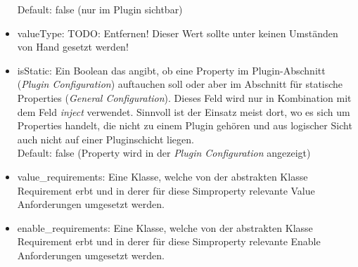 \documentclass[a4paper, 11pt]{article} %
\begin{document}
\begin{itemize}
	Default: false (nur im Plugin sichtbar)
	\item valueType: TODO: Entfernen! Dieser Wert sollte unter keinen Umständen von Hand gesetzt werden! 
	\item isStatic: Ein Boolean das angibt, ob eine Property im Plugin-Abschnitt (\emph{Plugin Configuration}) auftauchen soll oder aber im Abschnitt für statische Properties (\emph{General Configuration}). Dieses Feld wird nur in Kombination mit dem Feld \emph{inject} verwendet. Sinnvoll ist der Einsatz meist dort, wo es sich um Properties handelt, die nicht zu einem Plugin gehören und aus logischer Sicht auch nicht auf einer Pluginschicht liegen.\\
	Default: false (Property wird in der \emph{Plugin Configuration} angezeigt)
	\item value\_requirements: Eine Klasse, welche von der abstrakten Klasse Requirement erbt und in derer für diese Simproperty relevante Value Anforderungen umgesetzt werden.
	\item enable\_requirements: Eine Klasse, welche von der abstrakten Klasse Requirement erbt und in derer für diese Simproperty relevante Enable Anforderungen umgesetzt werden.
\end{itemize}
\end{document}

